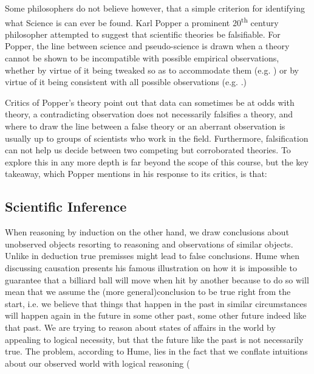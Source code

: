  		\par{Some philosophers do not believe however, that a simple criterion for identifying what Science is can ever be found. Karl Popper a prominent 20\textsuperscript{th} century philosopher attempted to suggest that scientific theories  be falsifiable. For Popper, the line between science and pseudo-science is drawn when a theory cannot be shown to be incompatible with possible empirical observations, whether by virtue of it being tweaked so as to accommodate them (e.g. ) or by virtue of it being consistent with all possible observations (e.g. .)
 		\par{Critics of Popper's theory point out that data can sometimes be at odds with theory, a contradicting observation does not necessarily falsifies a theory, and where to draw the line between a false theory or an aberrant observation is usually up to groups of scientists who work in the field. Furthermore, falsification can not help us decide between two competing but corroborated theories. To explore this in any more depth is far beyond the scope of this course, but the key takeaway, which Popper mentions in his response to its critics, is that:}


 	\subsection{Scientific Inference}




 		\par{When reasoning by induction on the other hand, we draw conclusions about unobserved objects resorting to reasoning and  observations of similar objects. Unlike in deduction true premisses might lead to false conclusions. Hume when discussing causation presents his famous illustration on how it is impossible to guarantee that a billiard ball will move when hit by another because to do so will mean that we assume the (more general)conclusion to be true right from the start, i.e. we believe that things that happen in the past in similar circumstances will happen again in the future  in some other past, some other future  indeed like that past. We are trying to reason about states of affairs in the world by appealing to logical necessity, but that the future  like the past is not necessarily true. The problem, according to Hume, lies in the fact that we conflate intuitions about our observed world with logical reasoning (

}}
